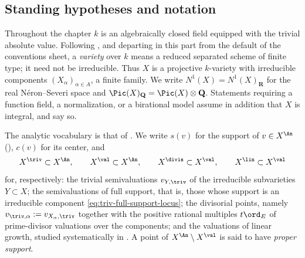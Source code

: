 \subsection{Standing hypotheses and notation}
\label{sec:ch34-hypotheses}

Throughout the chapter \(k\) is an algebraically closed field equipped with
the trivial absolute value.  Following \cite[\S1]{BJ22}, and departing in
this part from the default of the conventions sheet, a \emph{variety} over
\(k\) means a reduced separated scheme of finite type; it need not be
irreducible.  Thus \(X\) is a projective \(k\)-variety with irreducible
components \((X_\alpha)_{\alpha\in A}\), a finite family.  We write
\(N^1(X)=N^1(X)_{\mathbf R}\) for the real N\'eron--Severi space and
\(\Pic(X)_{\mathbf Q}=\Pic(X)\otimes\mathbf Q\).  Statements requiring a
function field, a normalization, or a birational model assume in addition
that \(X\) is integral, and say so.

The analytic vocabulary is that of .  We
write \(s(v)\) for the support of \(v\in X^{\An}\)
(), \(c(v)\) for its center, and
\begin{equation}
\label{eq:ch34-loci}
 X^{\triv}\subset X^{\An},\qquad
 X^{\val}\subset X^{\An},\qquad
 X^{\divis}\subset X^{\val},\qquad
 X^{\lin}\subset X^{\val}
\end{equation}
for, respectively: the trivial semivaluations \(v_{Y,\triv}\) of the
irreducible subvarieties \(Y\subset X\); the semivaluations of full support,
that is, those whose support is an irreducible component
\eqref{eq:triv-full-support-locus}; the divisorial points, namely
\(v_{\triv,\alpha}:=v_{X_\alpha,\triv}\) together with the positive rational
multiples \(t\ord_E\) of prime-divisor valuations over the components; and
the valuations of linear growth, studied systematically in
.  A point of
\(X^{\An}\setminus X^{\val}\) is said to have \emph{proper support}.

